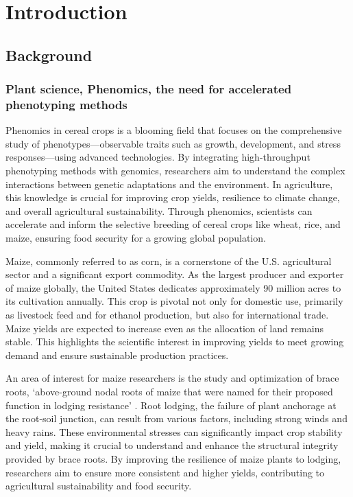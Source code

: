 % 
%
\chapter{Introduction}
\section{Background}
\subsection{Plant science, Phenomics, the need for accelerated phenotyping methods} 
Phenomics in cereal crops is a blooming field that focuses on the comprehensive study of phenotypes—observable traits such as growth, development, and stress responses—using advanced technologies. By integrating high-throughput phenotyping methods with genomics, researchers aim to understand the complex interactions between genetic adaptations and the environment. In agriculture, this knowledge is crucial for improving crop yields, resilience to climate change, and overall agricultural sustainability. Through phenomics, scientists can accelerate and inform the selective breeding of cereal crops like wheat, rice, and maize, ensuring food security for a growing global population.

Maize, commonly referred to as corn, is a cornerstone of the U.S. agricultural sector and a significant export commodity. As the largest producer and exporter of maize globally, the United States dedicates approximately 90 million acres to its cultivation annually.\cite{Ates_2023} This crop is pivotal not only for domestic use, primarily as livestock feed and for ethanol production, but also for international trade. Maize yields are expected to increase even as the allocation of land remains stable.\cite{AgOutlook2019} This highlights the scientific interest in improving yields to meet growing demand and ensure sustainable production practices.

An area of interest for maize researchers is the study and optimization of brace roots, ‘above-ground nodal roots of maize that were named for their proposed function in lodging resistance’ \cite{Blizard2020}. Root lodging, the failure of plant anchorage at the root-soil junction, can result from various factors, including strong winds and heavy rains\cite{Blizard2020}. These environmental stresses can significantly impact crop stability and yield, making it crucial to understand and enhance the structural integrity provided by brace roots. By improving the resilience of maize plants to lodging, researchers aim to ensure more consistent and higher yields, contributing to agricultural sustainability and food security.

